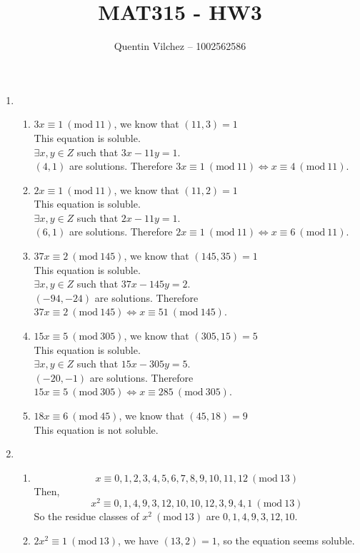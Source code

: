 \documentclass[11pt]{article}
\title{MAT315 - HW3}
\author{Quentin Vilchez -- 1002562586}
\newcommand{\Mod}[1]{\ (\mathrm{mod}\ #1)}
\begin{document}
\maketitle
\begin{enumerate}
\item{
\begin{enumerate}
\item $3x \equiv 1 \Mod{11}$, we know that $(11,3) = 1$\\
This equation is soluble.\\
$\exists x,y \in Z$ such that $3x -11y =1$.\\$(4,1)$ are solutions. Therefore $3x \equiv 1 \Mod{11} \iff x \equiv 4 \Mod{11}$.
\item $2x \equiv 1 \Mod{11}$, we know that $(11,2) = 1$\\
This equation is soluble.\\
$\exists x,y \in Z$ such that $2x -11y =1$.\\$(6,1)$ are solutions. Therefore $2x \equiv 1 \Mod{11} \iff x \equiv 6 \Mod{11}$.
\item $37x \equiv 2 \Mod{145}$, we know that $(145,35) = 1$\\
This equation is soluble.\\
$\exists x,y \in Z$ such that $37x -145y =2$.\\$(-94,-24)$ are solutions. Therefore $37x \equiv 2 \Mod{145} \iff x \equiv 51 \Mod{145}$.
\item $15x \equiv 5 \Mod{305}$, we know that $(305,15) = 5$\\
This equation is soluble.\\
$\exists x,y \in Z$ such that $15x -305y =5$.\\$(-20,-1)$ are solutions. Therefore $15x \equiv 5 \Mod{305} \iff x \equiv 285 \Mod{305}$.
\item $18x \equiv 6 \Mod{45}$, we know that $(45,18) = 9$\\
This equation is not soluble.\\
\end{enumerate}}
\item{\begin{enumerate}
\item $$ x \equiv 0,1,2,3,4,5,6,7,8,9,10,11,12 \Mod{13}$$
Then,
$$x^2 \equiv 0,1,4,9,3,12, 10,10, 12, 3, 9, 4, 1 \Mod{13}$$
So the residue classes of $x^2 \Mod{13}$ are $0,1,4,9,3,12, 10$.
\item $2x^2 \equiv 1 \Mod{13}$, we have $(13, 2) = 1$, so the equation seems soluble.\\

\end{enumerate}}
\end{enumerate}
\end{document}
